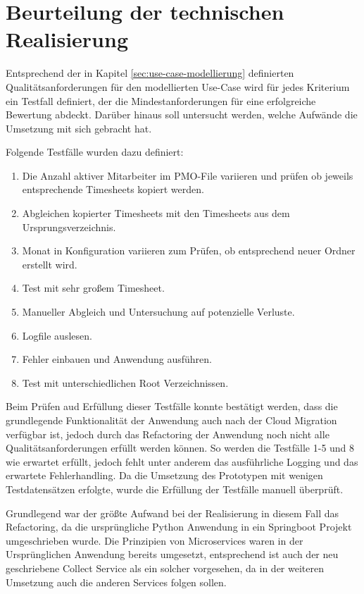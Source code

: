 \section{Beurteilung der technischen Realisierung}
Entsprechend der in Kapitel \ref{sec:use-case-modellierung} definierten Qualitätsanforderungen für den modellierten Use-Case wird für jedes Kriterium ein Testfall definiert, der die Mindestanforderungen für eine erfolgreiche Bewertung abdeckt. Darüber hinaus soll untersucht werden, welche Aufwände die Umsetzung mit sich gebracht hat.

Folgende Testfälle wurden dazu definiert:
\begin{enumerate}
    \item Die Anzahl aktiver Mitarbeiter im PMO-File variieren und prüfen ob jeweils entsprechende Timesheets kopiert werden.
    \item Abgleichen kopierter Timesheets mit den Timesheets aus dem Ursprungsverzeichnis.
    \item Monat in Konfiguration variieren zum Prüfen, ob entsprechend neuer Ordner erstellt wird.
    \item Test mit sehr großem Timesheet.
    \item Manueller Abgleich und Untersuchung auf potenzielle Verluste.
    \item Logfile auslesen.
    \item Fehler einbauen und Anwendung ausführen.
    \item Test mit unterschiedlichen Root Verzeichnissen.
\end{enumerate}

Beim Prüfen aud Erfüllung dieser Testfälle konnte bestätigt werden, dass die grundlegende Funktionalität der Anwendung auch nach der Cloud Migration verfügbar ist, jedoch durch das Refactoring der Anwendung noch nicht alle Qualitätsanforderungen erfüllt werden können. So werden die Testfälle 1-5 und 8 wie erwartet erfüllt, jedoch fehlt unter anderem das ausführliche Logging und das erwartete Fehlerhandling. Da  die Umsetzung des Prototypen mit wenigen Testdatensätzen erfolgte, wurde die Erfüllung der Testfälle manuell überprüft.

Grundlegend war der größte Aufwand bei der Realisierung in diesem Fall das Refactoring, da die ursprüngliche Python Anwendung in ein Springboot Projekt umgeschrieben wurde. Die Prinzipien von Microservices waren in der Ursprünglichen Anwendung bereits umgesetzt, entsprechend ist auch der neu geschriebene Collect Service als ein solcher vorgesehen, da in der weiteren Umsetzung auch die anderen Services folgen sollen. \pagebreak
